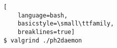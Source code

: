 \ApplyOnePageAppendixPageStyle{}

\begin{lstlisting}[
	language=bash,
	basicstyle=\small\ttfamily,
	breaklines=true]
$ valgrind ./ph2daemon
\end{lstlisting}

